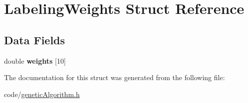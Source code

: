 \hypertarget{structLabelingWeights}{}\section{Labeling\+Weights Struct Reference}
\label{structLabelingWeights}
\subsection*{Data Fields}
\begin{DoxyCompactItemize}
\item 
double {\bfseries weights} \mbox{[}10\mbox{]}\hypertarget{structLabelingWeights_ad7596c0f8bf63206c137f376804578cf}{}\label{structLabelingWeights_ad7596c0f8bf63206c137f376804578cf}

\end{DoxyCompactItemize}


The documentation for this struct was generated from the following file\+:\begin{DoxyCompactItemize}
\item 
code/\hyperlink{geneticAlgorithm_8h}{genetic\+Algorithm.\+h}\end{DoxyCompactItemize}
